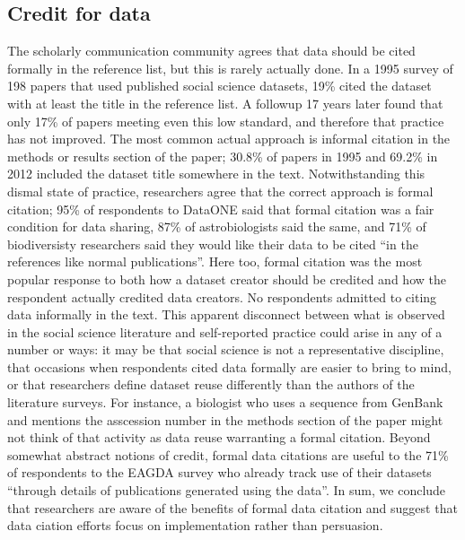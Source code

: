 \documentclass[10pt]{article}
\begin{document}
\subsection*{Credit for data}

The scholarly communication community agrees that data should be cited formally in the reference list\cite{force11_data_citation_synthesis_group_joint_2014}, but this is rarely actually done\cite{sieber_not_1995, mooney_citing_2011, mooney_anatomy_2012}.
In a 1995 survey of 198 papers that used published social science datasets, 19\% cited the dataset with at least the title in the reference list\cite{sieber_not_1995}.
A followup 17 years later found that only 17\% of papers meeting even this low standard, and therefore that practice has not improved\cite{mooney_anatomy_2012}.
The most common actual approach is informal citation in the methods or results section of the paper; 30.8\% of papers in 1995 and 69.2\% in 2012 included the dataset title somewhere in the text.
Notwithstanding this dismal state of practice, researchers agree that the correct approach is formal citation; 95\% of respondents to DataONE said that formal citation was a fair condition for data sharing, 87\% of astrobiologists said the same, and 71\% of biodiversisty researchers said they would like their data to be cited ``in the references like normal publications''\cite{tenopir_data_2011, aydingolu_data_2014, enke_user's_2012}.
Here too, formal citation was the most popular response to both how a dataset creator should be credited and how the respondent actually credited data creators.
No respondents admitted to citing data informally in the text.
This apparent disconnect between what is observed in the social science literature and self-reported practice could arise in any of a number or ways: it may be that social science is not a representative discipline, that occasions when respondents cited data formally are easier to bring to mind, or that researchers define dataset reuse differently than the authors of the literature surveys.
For instance, a biologist who uses a sequence from GenBank and mentions the asscession number in the methods section of the paper might not think of that activity as data reuse warranting a formal citation.
Beyond somewhat abstract notions of credit, formal data citations are useful to the 71\% of respondents to the EAGDA survey who already track use of their datasets ``through details of publications generated using the data''\cite{bobrow_establishing_2014}. 
In sum, we conclude that researchers are aware of the benefits of formal data citation and suggest that data ciation efforts focus on implementation rather than persuasion. 
\end{document}
